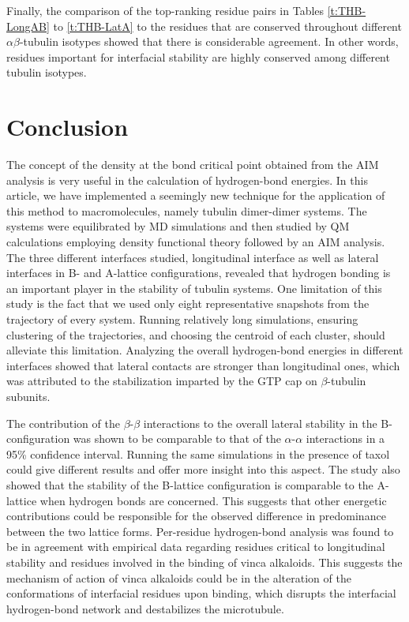 \documentclass[11pt]{report}
\begin{document}
Finally, the comparison of the top-ranking residue pairs in
Tables \ref{t:THB-LongAB} to \ref{t:THB-LatA} to the residues that are conserved throughout different $\alpha$$\beta$-tubulin isotypes
\cite{Torin2006,Sirajuddin2014} 
showed that there is considerable agreement. In other words, residues important for interfacial stability are highly conserved among different tubulin isotypes.

\section{Conclusion}
\label{s:THB-Conclusion}

The concept of the density at the bond critical point obtained from the AIM analysis is very useful in the calculation of hydrogen-bond energies. In this article, we have implemented a seemingly new technique for the application of this method to macromolecules, namely tubulin dimer-dimer systems. The systems were equilibrated by MD simulations and then studied by QM calculations employing density functional theory followed by an AIM analysis. The three different interfaces studied, longitudinal interface
as well as lateral interfaces in B- and A-lattice configurations, revealed that hydrogen bonding is an important player in the stability of tubulin systems. One limitation of this study is the fact that we used only eight representative snapshots from the trajectory of every system. Running relatively long simulations, ensuring clustering of the trajectories, and choosing the centroid of each cluster, should alleviate this limitation. Analyzing the overall hydrogen-bond energies in different interfaces showed that lateral contacts are stronger than longitudinal ones, which was attributed to the stabilization imparted by the GTP cap on $\beta$-tubulin subunits.

The contribution of the $\beta$-$\beta$ interactions to the overall
lateral stability in the B-configuration was shown to be comparable to that of the $\alpha$-$\alpha$ interactions in a 95\% confidence interval. Running the same simulations in the presence of taxol could give different results and offer more insight into this aspect. The study also showed that the stability of the B-lattice configuration is comparable to the A-lattice when hydrogen bonds are concerned. This suggests that other energetic contributions could be responsible for the observed difference in predominance between the two lattice forms. Per-residue hydrogen-bond analysis was found to be in agreement with empirical data regarding residues critical to longitudinal stability and residues involved in the binding of vinca alkaloids. This suggests the mechanism of action of vinca alkaloids could be in the alteration of the conformations of interfacial residues upon binding, which disrupts the interfacial hydrogen-bond network and destabilizes the microtubule.
\end{document}

